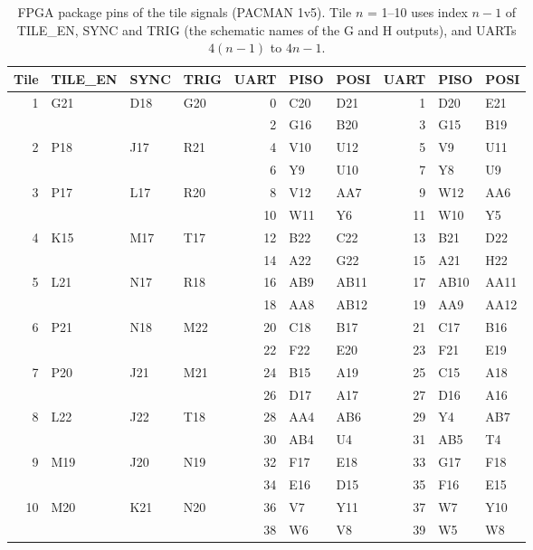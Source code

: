 \documentclass[12pt]{article}
\begin{document}
\begin{table}[htbp]
\caption{\label{tbl:pins-tile} FPGA package pins of the tile signals (PACMAN 1v5).  Tile $n$ = 1--10 uses
  index $n-1$ of TILE\_EN, SYNC and TRIG (the schematic names of the G and H outputs), and UARTs $4(n-1)$ to $4n-1$.}
\begin{center}
\begin{tabular}{rlll@{\hspace{2em}}rllrll}
Tile & TILE\_EN & SYNC & TRIG & UART & PISO & POSI & UART & PISO & POSI \\
\hline
1 & G21 & D18 & G20 & 0 & C20 & D21 & 1 & D20 & E21 \\
 & & & & 2 & G16 & B20 & 3 & G15 & B19 \\
\hline
2 & P18 & J17 & R21 & 4 & V10 & U12 & 5 & V9 & U11 \\
 & & & & 6 & Y9 & U10 & 7 & Y8 & U9 \\
\hline
3 & P17 & L17 & R20 & 8 & V12 & AA7 & 9 & W12 & AA6 \\
 & & & & 10 & W11 & Y6 & 11 & W10 & Y5 \\
\hline
4 & K15 & M17 & T17 & 12 & B22 & C22 & 13 & B21 & D22 \\
 & & & & 14 & A22 & G22 & 15 & A21 & H22 \\
\hline
5 & L21 & N17 & R18 & 16 & AB9 & AB11 & 17 & AB10 & AA11 \\
 & & & & 18 & AA8 & AB12 & 19 & AA9 & AA12 \\
\hline
6 & P21 & N18 & M22 & 20 & C18 & B17 & 21 & C17 & B16 \\
 & & & & 22 & F22 & E20 & 23 & F21 & E19 \\
\hline
7 & P20 & J21 & M21 & 24 & B15 & A19 & 25 & C15 & A18 \\
 & & & & 26 & D17 & A17 & 27 & D16 & A16 \\
\hline
8 & L22 & J22 & T18 & 28 & AA4 & AB6 & 29 & Y4 & AB7 \\
 & & & & 30 & AB4 & U4 & 31 & AB5 & T4 \\
\hline
9 & M19 & J20 & N19 & 32 & F17 & E18 & 33 & G17 & F18 \\
 & & & & 34 & E16 & D15 & 35 & F16 & E15 \\
\hline
10 & M20 & K21 & N20 & 36 & V7 & Y11 & 37 & W7 & Y10 \\
 & & & & 38 & W6 & V8 & 39 & W5 & W8 \\
\end{tabular}
\end{center}
\end{table}
\end{document}
